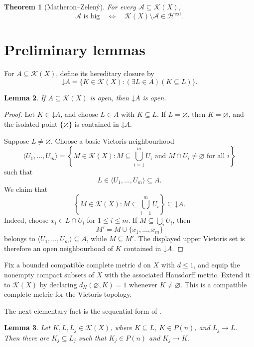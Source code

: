 \documentclass[11pt]{amsart}
\newtheorem{theorem}{Theorem}[section]
\newtheorem{lemma}[theorem]{Lemma}
\theoremstyle{remark}
\newcommand{\K}{\mathcal K}
\newcommand{\HH}{\mathcal H}
\newcommand{\down}[1]{\mathord{\downarrow}\!#1}
\begin{document}
\begin{theorem}[Matheron--Zelený]\label{thm:MZcriterion}
For every $\mathcal A\subseteq\K(X)$,
\[
\mathcal A\text{ is big}
\quad\Longleftrightarrow\quad
\K(X)\setminus\mathcal A\in\HH^{\mathrm{ext}}.
\]
\end{theorem}

\section{Preliminary lemmas}

For $A\subseteq\K(X)$, define its hereditary closure by
\[
\down A
=
\{K\in\K(X): (\exists L \in A) (K\subseteq L)\}.
\]

\begin{lemma}\label{lem:open}
If $A\subseteq\K(X)$ is open, then $\down A$ is open.
\end{lemma}

\begin{proof}
Let $K\in\down A$, and choose $L\in A$ with $K\subseteq L$.
If $L=\varnothing$, then $K=\varnothing$, and the isolated point
$\{\varnothing\}$ is contained in $\down A$.

Suppose $L\neq\varnothing$. Choose a basic Vietoris neighbourhood
\[
\langle U_1,\ldots,U_m\rangle
=
\left\{
M\in\K(X):
M\subseteq\bigcup_{i=1}^m U_i
\text{ and }
M\cap U_i\neq\varnothing\text{ for all }i
\right\}
\]
such that
\[
L\in\langle U_1,\ldots,U_m\rangle\subseteq A.
\]
We claim that
\[
\left\{
M\in\K(X):M\subseteq\bigcup_{i=1}^m U_i
\right\}
\subseteq\down A.
\]
Indeed, choose $x_i\in L\cap U_i$ for $1\leq i\leq m$. If
$M\subseteq\bigcup_iU_i$, then
\[
M'=M\cup\{x_1,\ldots,x_m\}
\]
belongs to $\langle U_1,\ldots,U_m\rangle\subseteq A$, while
$M\subseteq M'$. The displayed upper Vietoris set is therefore an open
neighbourhood of $K$ contained in $\down A$.
\end{proof}

Fix a bounded compatible complete metric $d$ on $X$ with $d \leq 1$, and equip the nonempty compact subsets of $X$ with the
associated Hausdorff metric. Extend it to $\K(X)$ by declaring
$d_H(\varnothing,K)=1$ whenever $K\neq\varnothing$. This is a compatible
complete metric for the Vietoris topology.

The next elementary fact is the sequential form of
\cite[Lemma~2.6(i)]{MZ05}.

\begin{lemma}\label{lem:finite-approx}
Let $K,L,L_j\in\K(X)$, where $K\subseteq L$, $K\in P(n)$, and
$L_j\to L$. Then there are $K_j\subseteq L_j$ such that
$K_j\in P(n)$ and $K_j\to K$.
\end{lemma}
\end{document}
